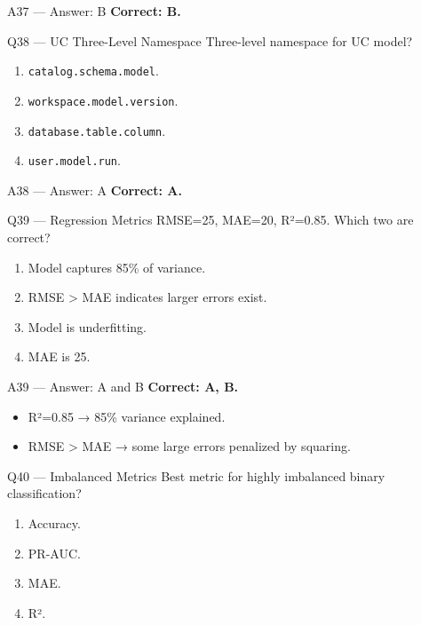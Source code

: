 \documentclass[aspectratio=169,9pt]{beamer}
\begin{document}
	\begin{frame}{A37 — Answer: B}
		\textbf{Correct: B.}
	\end{frame}
	
	\begin{frame}{Q38 — UC Three-Level Namespace}
		Three-level namespace for UC model?
		\begin{enumerate}[label=\Alph*.]
			\item \texttt{catalog.schema.model}.
			\item \texttt{workspace.model.version}.
			\item \texttt{database.table.column}.
			\item \texttt{user.model.run}.
		\end{enumerate}
	\end{frame}
	
	\begin{frame}{A38 — Answer: A}
		\textbf{Correct: A.}
	\end{frame}
	
	
	\begin{frame}{Q39 — Regression Metrics}
		RMSE=25, MAE=20, R²=0.85. Which two are correct?
		\begin{enumerate}[label=\Alph*.]
			\item Model captures 85\% of variance.
			\item RMSE > MAE indicates larger errors exist.
			\item Model is underfitting.
			\item MAE is 25.
		\end{enumerate}
	\end{frame}
	
	\begin{frame}{A39 — Answer: A and B}
		\textbf{Correct: A, B.}
		\begin{itemize}
			\item R²=0.85 → 85\% variance explained.
			\item RMSE > MAE → some large errors penalized by squaring.
		\end{itemize}
	\end{frame}
	
	\begin{frame}{Q40 — Imbalanced Metrics}
		Best metric for highly imbalanced binary classification?
		\begin{enumerate}[label=\Alph*.]
			\item Accuracy.
			\item PR-AUC.
			\item MAE.
			\item R².
		\end{enumerate}
	\end{frame}
	
\end{document}
